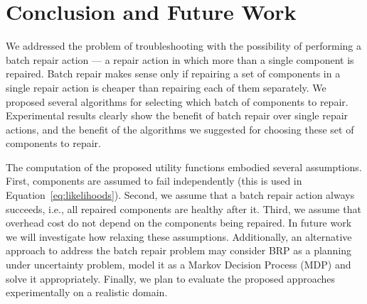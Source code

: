 \documentclass[letterpaper]{article}
\newcommand{\myopic}{{\tt Myopic-BRP}}
\newcommand{\planbased}{{\tt Plan-based-BRP}}
\begin{document}


\section{Conclusion and Future Work}
We addressed the problem of troubleshooting with the possibility of performing a batch repair action --- a repair action in which more than a single component is repaired. Batch repair makes sense only if repairing a set of components in a single repair action is cheaper than repairing each of them separately. We proposed several algorithms for selecting which batch of components to repair. Experimental results clearly show the benefit of batch repair over single repair actions, and the benefit of the algorithms we suggested for choosing these set of components to repair.

The computation of the proposed utility functions embodied several assumptions. First, components are assumed to fail independently (this is used in Equation~\ref{eq:likelihoods}). Second, we assume that a batch repair action always succeeds, i.e., all repaired components are healthy after it. Third, we assume that overhead cost do not depend on the components being repaired. In future work we will investigate how relaxing these assumptions. %
Additionally, an alternative approach to address the batch repair problem may consider BRP as a planning under uncertainty problem, model it as a Markov Decision Process (MDP) and solve it appropriately. Finally, we plan to evaluate the proposed approaches experimentally on a realistic domain.




\end{document}
